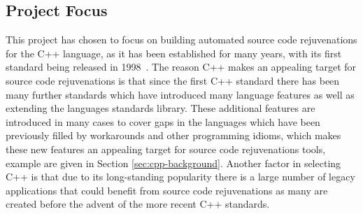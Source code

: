 \documentclass[bsc,frontabs,singlespacing,twoside,parskip,deptreport]{infthesis}
\begin{document}
\subsection{Project Focus}

This project has chosen to focus on building automated source code rejuvenations for the C++ language, as it has been established for many years, with its first standard being released in 1998~\cite{ISO:1998:IIP}. The reason C++ makes an appealing target for source code rejuvenations is that since the first C++ standard there has been many further standards which have introduced many language features as well as extending the languages standards library. These additional features are introduced in many cases to cover gaps in the languages which have been previously filled by workarounds and other programming idioms, which makes these new features an appealing target for source code rejuvenations tools, example are given in Section \ref{sec:cpp-background}. Another factor in selecting C++ is that due to its long-standing popularity there is a large number of legacy applications that could benefit from source code rejuvenations as many are created before the advent of the more recent C++ standards. 

% 






    

\end{document}
